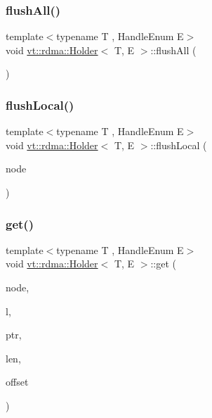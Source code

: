 \subsubsection{\texorpdfstring{flush\+All()}{flushAll()}}
{\footnotesize\ttfamily template$<$typename T , Handle\+Enum E$>$ \\
void \hyperlink{structvt_1_1rdma_1_1_holder}{vt\+::rdma\+::\+Holder}$<$ T, E $>$\+::flush\+All (\begin{DoxyParamCaption}{ }\end{DoxyParamCaption})}

\mbox{\label{structvt_1_1rdma_1_1_holder_a4b576d334034884d7c72b89310fd4f57}} 
\subsubsection{\texorpdfstring{flush\+Local()}{flushLocal()}}
{\footnotesize\ttfamily template$<$typename T , Handle\+Enum E$>$ \\
void \hyperlink{structvt_1_1rdma_1_1_holder}{vt\+::rdma\+::\+Holder}$<$ T, E $>$\+::flush\+Local (\begin{DoxyParamCaption}\item[{\hyperlink{namespacevt_a866da9d0efc19c0a1ce79e9e492f47e2}{vt\+::\+Node\+Type}}]{node }\end{DoxyParamCaption})}

\mbox{\label{structvt_1_1rdma_1_1_holder_a065715e0c91be9b411b490b740fc064a}} 
\subsubsection{\texorpdfstring{get()}{get()}}
{\footnotesize\ttfamily template$<$typename T , Handle\+Enum E$>$ \\
void \hyperlink{structvt_1_1rdma_1_1_holder}{vt\+::rdma\+::\+Holder}$<$ T, E $>$\+::get (\begin{DoxyParamCaption}\item[{\hyperlink{namespacevt_a866da9d0efc19c0a1ce79e9e492f47e2}{vt\+::\+Node\+Type}}]{node,  }\item[{\hyperlink{namespacevt_1_1rdma_ac5c20b41a653e520b6305d4d454ecb70}{Lock}}]{l,  }\item[{T $\ast$}]{ptr,  }\item[{std\+::size\+\_\+t}]{len,  }\item[{int}]{offset }\end{DoxyParamCaption})}

